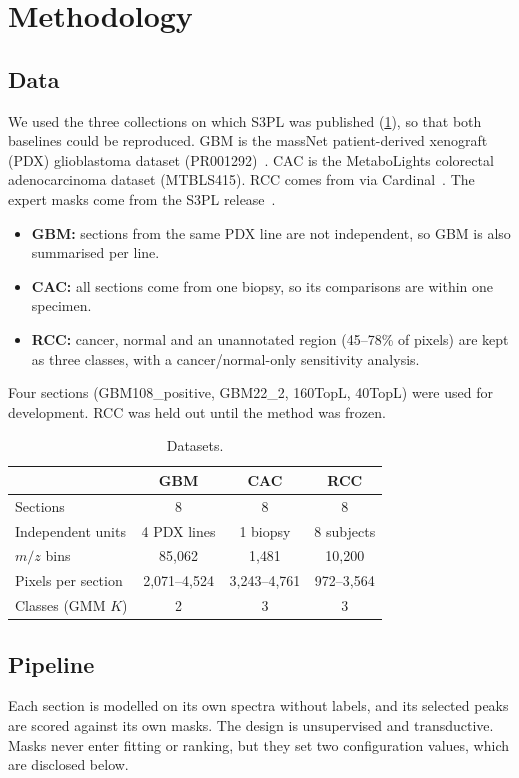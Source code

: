 \section{Methodology}
\label{sec:methodology}

\subsection{Data}
\label{sec:data}
We used the three collections on which S3PL was published (\cref{tab:data}),
so that both baselines could be reproduced. GBM is the massNet patient-derived
xenograft (PDX) glioblastoma dataset (PR001292)~\citep{abdelmoula2022massnet}.
CAC is the MetaboLights colorectal adenocarcinoma dataset
(MTBLS415). RCC comes from
\citet{dill2010rcc} via Cardinal~\citep{bemis2015cardinal}. The expert masks
come from the S3PL release~\citep{weigand2026spatial}.
\begin{itemize}
  \item \textbf{GBM:} sections from the same PDX line are not independent, so
        GBM is also summarised per line.
  \item \textbf{CAC:} all sections come from one biopsy, so its comparisons
        are within one specimen.
  \item \textbf{RCC:} cancer, normal and an unannotated region (45--78\% of
        pixels) are kept as three classes, with a cancer/normal-only
        sensitivity analysis.
\end{itemize}
Four sections (GBM108\_positive, GBM22\_2, 160TopL, 40TopL) were used for
development. RCC was held out until the method was frozen.

\begin{table}[t]
\caption{Datasets.}
\label{tab:data}
\centering\small
\begin{tabular}{@{}lccc@{}}
\toprule
 & GBM & CAC & RCC \\
\midrule
Sections & 8 & 8 & 8 \\
Independent units & 4 PDX lines & 1 biopsy & 8 subjects \\
$m/z$ bins & 85{,}062 & 1{,}481 & 10{,}200 \\
Pixels per section & 2{,}071--4{,}524 & 3{,}243--4{,}761 & 972--3{,}564 \\
Classes (GMM $K$) & 2 & 3 & 3 \\
\bottomrule
\end{tabular}
\end{table}

\subsection{Pipeline}
\label{sec:pipeline}
Each section is modelled on its own spectra without labels, and its selected
peaks are scored against its own masks. The design is unsupervised and
transductive. Masks never enter fitting or ranking, but they set two
configuration values, which are disclosed below.

